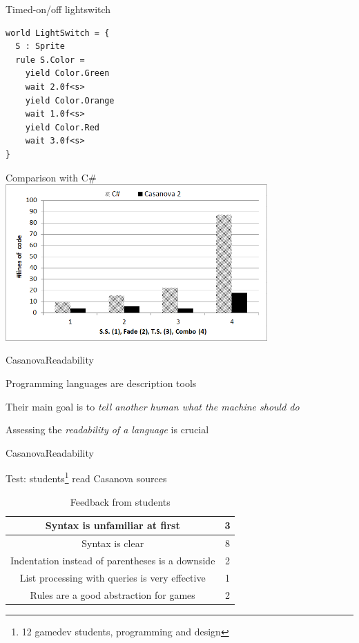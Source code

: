 \documentclass{beamer}
\begin{document}
\begin{frame}[fragile]{Timed-on/off lightswitch}
\begin{lstlisting}[frame=shadowbox]
world LightSwitch = {
  S : Sprite
  rule S.Color = 
    yield Color.Green
    wait 2.0f<s>
    yield Color.Orange
    wait 1.0f<s>
    yield Color.Red
    wait 3.0f<s>
}
\end{lstlisting}
\end{frame}

\begin{frame}{Comparison with C\#}
\center
\includegraphics[height=6.0cm]{Pics/code_length_comparison.png}
\end{frame}

\begin{slide}{Casanova}{Readability}{
\item Programming languages are description tools
\item Their main goal is to \textit{tell another human what the machine should do} \cite{dijkstra1979programming}
\item Assessing the \textit{readability of a language} is crucial
}\end{slide}

\begin{slide}{Casanova}{Readability}{
\item Test: students\footnote{12 gamedev students, programming and design} read Casanova sources
\begin{table}[!t]
\caption{Feedback from students}
\label{students_feedback}
\centering
\begin{tabular}{|c||c|}
\hline
Syntax is unfamiliar at first & 3\\
\hline
Syntax is clear & 8\\
\hline
Indentation instead of parentheses is a downside & 2\\
\hline
List processing with queries is very effective & 1\\
\hline
Rules are a good abstraction for games & 2\\
\hline
\end{tabular}
\end{table}
}\end{slide}
\end{document}
